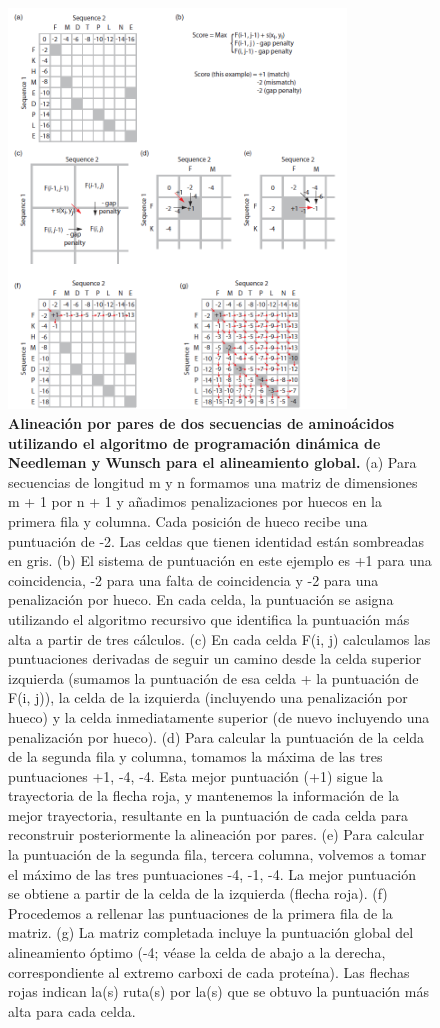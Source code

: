 \begin{figure}[htbp]
\centering
\includegraphics[width=0.8\textwidth]{figs/programacion-dinamica.png}
\caption{\small \textbf{Alineación por pares de dos secuencias de aminoácidos utilizando el algoritmo de programación dinámica de Needleman y Wunsch para el alineamiento global.} (a) Para secuencias de longitud m y n formamos una matriz de dimensiones m + 1 por n + 1 y añadimos penalizaciones por huecos en la primera fila y columna. Cada posición de hueco recibe una puntuación de -2. Las celdas que tienen identidad están sombreadas en gris. (b) El sistema de puntuación en este ejemplo es +1 para una coincidencia, -2 para una falta de coincidencia y -2 para una penalización por hueco. En cada celda, la puntuación se asigna utilizando el algoritmo recursivo que identifica la puntuación más alta a partir de tres cálculos. (c) En cada celda F(i, j) calculamos las puntuaciones derivadas de seguir un camino desde la celda superior izquierda (sumamos la puntuación de esa celda + la puntuación de F(i, j)), la celda de la izquierda (incluyendo una penalización por hueco) y la celda inmediatamente superior (de nuevo incluyendo una penalización por hueco). (d) Para calcular la puntuación de la celda de la segunda fila y columna, tomamos la máxima de las tres puntuaciones +1, -4, -4. Esta mejor puntuación (+1) sigue la trayectoria de la flecha roja, y mantenemos la información de la mejor trayectoria, resultante en la puntuación de cada celda para reconstruir posteriormente la alineación por pares. (e) Para calcular la puntuación de la segunda fila, tercera columna, volvemos a tomar el máximo de las tres puntuaciones -4, -1, -4. La mejor puntuación se obtiene a partir de la celda de la izquierda (flecha roja). (f) Procedemos a rellenar las puntuaciones de la primera fila de la matriz. (g) La matriz completada incluye la puntuación global del alineamiento óptimo (-4; véase la celda de abajo a la derecha, correspondiente al extremo carboxi de cada proteína). Las flechas rojas indican la(s) ruta(s) por la(s) que se obtuvo la puntuación más alta para cada celda.}

\end{figure}
